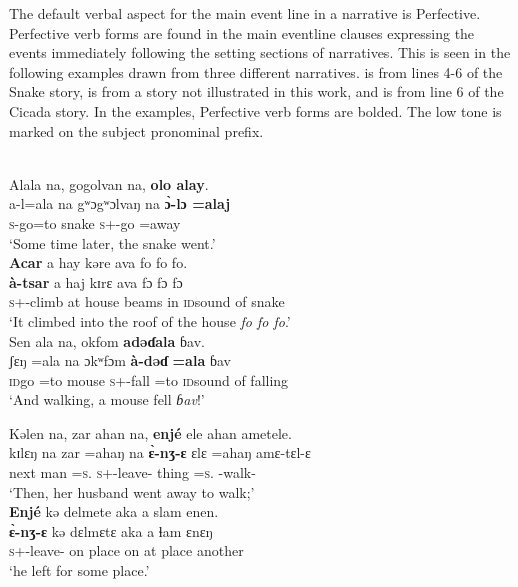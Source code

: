 The default verbal aspect for the main event line in a narrative is Perfective. Perfective verb forms are found in the main eventline clauses expressing the events immediately following the setting sections of narratives. This is seen in the following examples drawn from three different narratives.  is from lines 4-6 of the Snake story,  is from a story not illustrated in this work, and  is from line 6 of the Cicada story. In the examples, Perfective verb forms are bolded. The low tone is marked on the subject pronominal prefix. 

\ea\label{ex:7:46}\\
Alala  na,  gogolvan  na,  \textbf{olo  alay}.\\ 
\gll a-l=ala        na gʷɔgʷɔlvaŋ   na         \textbf{\`{ɔ}-lɔ  =alaj}\\
\textsc{s}-go=to {\PSP} snake   {\PSP}  {\textsc{s}+{\PFV}-go =away}\\
\glt ‘Some time later, the snake went.’\\
\medskip
 \textbf{Acar}  a  hay  kəre  ava fo fo fo.\\
\gll \textbf{à-tsar} a haj kɪrɛ ava {fɔ fɔ fɔ}\\
\textsc{s}+{\PFV}-climb       at   house   beams  in          {\textsc{id}sound of snake}\\
\glt ‘It climbed into the roof of the house \textit{fo fo fo}.’\\
\medskip
Sen  ala  na, okfom  \textbf{adəɗala}  ɓav. \\
\gll ʃɛŋ  =ala na ɔkʷfɔm \textbf{à-dəɗ} \textbf{=ala} ɓav\\
\textsc{id}go  =to      {\PSP}   mouse  \textsc{s}+{\PFV}-fall  =to     {\textsc{id}sound of falling} \\
\glt ‘And walking, a mouse fell \textit{ɓav}!’
\z

\ea\label{ex:7:47}
Kəlen  na,  zar  ahan  na,  \textbf{enjé}  ele  ahan  ametele.\\
\gll kɪlɛŋ   na  zar  =ahaŋ    na  \textbf{\`ɛ{}-nʒ-ɛ}    ɛlɛ    =ahaŋ        amɛ-tɛl-ɛ\\
next     {\PSP}  man   =\textsc{s}.{\POSS}  {\PSP}  \textsc{s}+{\PFV}-leave-{\CL}  thing  =\textsc{s}.{\POSS}  {\DEP}-walk-{\CL} \\
\glt ‘Then, her husband went away to walk;’\\
\medskip
\clearpage
\textbf{Enjé} kə  delmete  aka  a  slam  enen.\\
\gll \textbf{\`ɛ-nʒ-ɛ} kə dɛlmɛtɛ aka a ɬam ɛnɛŋ\\
\textsc{s}+{\PFV}-leave-{\CL}   on   place       on    at  place   another\\
\glt ‘he left for some place.’  
\z



